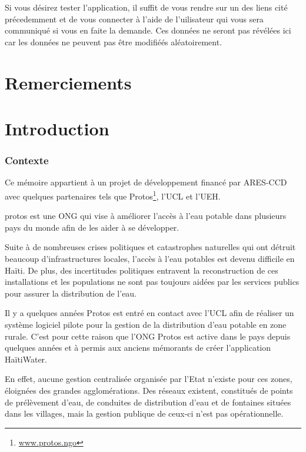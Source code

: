 \documentclass{EPL-master-thesis-covers-FR}
\begin{document}
		Si vous désirez tester l'application, il suffit de vous rendre sur un des liens cité précedemment et de vous connecter à l'aide de l'uilisateur qui vous sera communiqué si vous en faite la demande. Ces données ne seront pas révélées ici car les données ne peuvent pas être modifiéés aléatoirement. 
		

	\chapter*{Remerciements}

		


	\chapter{Introduction}

		
		\subsection*{Contexte}
		
			Ce mémoire appartient à un projet de développement financé par ARES-CCD avec quelques partenaires tels que Protos\footnote{\href{https://www.protos.ngo/fr/}{www.protos.ngo}}, l'UCL et l'UEH. 
			
			protos est une ONG qui vise à améliorer l'accès à l'eau potable dans plusieurs pays du monde afin de les aider à se développer. 
			
			Suite à de nombreuses crises politiques et catastrophes naturelles qui ont détruit beaucoup d'infrastructures locales, l'accès à l'eau potables est devenu difficile en Haïti. De plus, des incertitudes politiques entravent la reconstruction de ces installations et les populations ne sont pas toujours aidées par les services publics pour assurer la distribution de l'eau. 
			
			Il y a quelques années Protos est entré en contact avec l'UCL afin de réaliser un système logiciel pilote pour la gestion de la distribution d'eau potable en zone rurale. C'est pour cette raison que l'ONG Protos est active dans le pays depuis quelques années et à permis aux anciens mémorants de créer l'application HaïtiWater.
			
			 En effet, aucune gestion centralisée organisée par l'Etat n'existe pour ces zones, éloignées des grandes agglomérations. Des réseaux existent, constitués de points de prélèvement d'eau, de conduites de distribution d'eau et de fontaines situées dans les villages, mais la gestion publique de ceux-ci n'est pas opérationnelle. 
\end{document}
